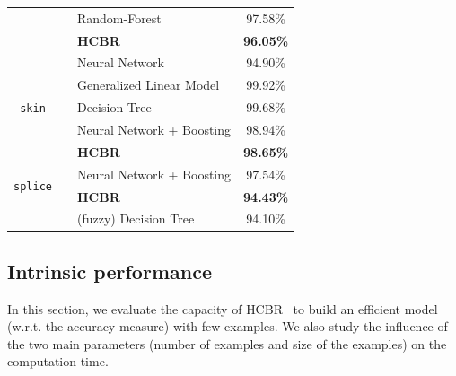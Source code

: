 \documentclass[sigconf,edbt]{acmart-edbt-workshops}
\def\HCBR{{\sc HCBR}}
\def\bfHCBR{{\sc \bf HCBR}}
\begin{document}
\begin{table}[tb]
\begin{center}
\begin{small}
\begin{tabular}{|c|c|l|c|}
 &  \cite{7881507} & Random-Forest & 97.58\% \\ 
 & & {\bf \bfHCBR}& {\bf  96.05\%} \\
 & \cite{7727750} & Neural Network &  94.90\% \\\hline
 \multirow{3}{*}{\texttt{skin}} & \cite{basterrech2015generalized} & Generalized Linear Model & 99.92\% \\ 
 & \cite{6627823} & Decision Tree & 99.68\% \\ 
 & \cite{catak2017} & Neural Network + Boosting & 98.94\% \\
 & & {\bf \bfHCBR} & {\bf 98.65\%} \\ \hline
 \multirow{2}{*}{\texttt{splice}} & \cite{catak2017} & Neural Network + Boosting & 97.54\% \\
 & & {\bf \bfHCBR} & {\bf 94.43\%} \\
 & \cite{5409447} & (fuzzy) Decision Tree & 94.10\% \\ \hline
\end{tabular}
\end{small}
  \label{table:prev_results}
\end{center}
\end{table}
\subsection{Intrinsic performance}

In this section, we evaluate the capacity of \HCBR~ to build an efficient model (w.r.t. the accuracy measure) with few examples. We also study the influence of the two main parameters (number of examples and size of the examples) on the computation time.\\
\end{document}
